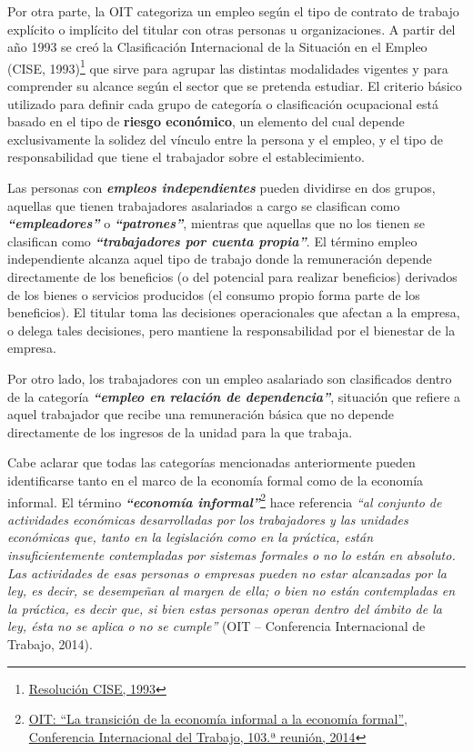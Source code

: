 \documentclass[
  openany]{book}
\begin{document}
Por otra parte, la OIT categoriza un empleo según el tipo de contrato de trabajo explícito o implícito del titular con otras personas u organizaciones. A partir del año 1993 se creó la Clasificación Internacional de la Situación en el Empleo (CISE, 1993)\footnote{\href{http://www.ilo.org/public/spanish/bureau/stat/download/res/icse.pdf}{Resolución CISE, 1993}} que sirve para agrupar las distintas modalidades vigentes y para comprender su alcance según el sector que se pretenda estudiar. El criterio básico utilizado para definir cada grupo de categoría o clasificación ocupacional está basado en el tipo de \textbf{riesgo económico}, un elemento del cual depende exclusivamente la solidez del vínculo entre la persona y el empleo, y el tipo de responsabilidad que tiene el trabajador sobre el establecimiento.

Las personas con \textbf{\emph{empleos independientes}} pueden dividirse en dos grupos, aquellas que tienen trabajadores asalariados a cargo se clasifican como \textbf{\emph{``empleadores''}} o \textbf{\emph{``patrones''}}, mientras que aquellas que no los tienen se clasifican como \textbf{\emph{``trabajadores por cuenta propia''}}. El término empleo independiente alcanza aquel tipo de trabajo donde la remuneración depende directamente de los beneficios (o del potencial para realizar beneficios) derivados de los bienes o servicios producidos (el consumo propio forma parte de los beneficios). El titular toma las decisiones operacionales que afectan a la empresa, o delega tales decisiones, pero mantiene la responsabilidad por el bienestar de la empresa.

Por otro lado, los trabajadores con un empleo asalariado son clasificados dentro de la categoría \textbf{\emph{``empleo en relación de dependencia''}}, situación que refiere a aquel trabajador que recibe una remuneración básica que no depende directamente de los ingresos de la unidad para la que trabaja.

Cabe aclarar que todas las categorías mencionadas anteriormente pueden identificarse tanto en el marco de la economía formal como de la economía informal. El término \textbf{\emph{``economía informal''}}\footnote{\href{https://www.ilo.org/wcmsp5/groups/public/---ed_norm/---relconf/documents/meetingdocument/wcms_218350.pdf}{OIT: ``La transición de la economía informal a la economía formal'', Conferencia Internacional del Trabajo, 103.ª reunión, 2014}} hace referencia \emph{``al conjunto de actividades económicas desarrolladas por los trabajadores y las unidades económicas que, tanto en la legislación como en la práctica, están insuficientemente contempladas por sistemas formales o no lo están en absoluto. Las actividades de esas personas o empresas pueden no estar alcanzadas por la ley, es decir, se desempeñan al margen de ella; o bien no están contempladas en la práctica, es decir que, si bien estas personas operan dentro del ámbito de la ley, ésta no se aplica o no se cumple''} (OIT -- Conferencia Internacional de Trabajo, 2014).
\end{document}
